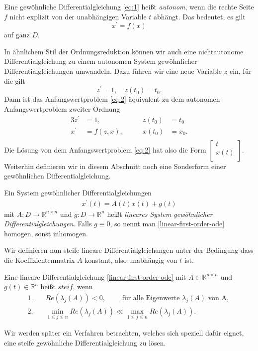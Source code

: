 \begin{definition}
    Eine gewöhnliche Differentialgleichung \eqref{eq:1} heißt {\em autonom}, wenn die rechte Seite $f$ nicht
    explizit von der unabhängigen Variable $t$ abhängt. Das bedeutet, es gilt
    \[
        x^{\prime} = f(x)
    \]
    auf ganz $D$.
\end{definition}
In ähnlichem Stil der Ordnungsreduktion können wir auch eine nichtautonome Differentialgleichung zu einem autonomen
System gewöhnlicher Differentialgleichungen umwandeln. Dazu führen wir eine neue Variable $z$ ein, für die gilt
\[
    z^{\prime} = 1, \quad z(t_0) = t_0.
\]
Dann ist das Anfangswertproblem \eqref{eq:2} äquivalent zu dem autonomen Anfangswertproblem zweiter Ordnung
\begin{alignat*}{3}
    z^{\prime} &= 1, \qquad &z(t_0) &= t_0 \\
    x^{\prime} &= f(z,x),\qquad  &x(t_0) &= x_0. \\
\end{alignat*}
Die Lösung von dem Anfangswertproblem \eqref{eq:2} hat also die Form $\left[ \begin{matrix}
                                         t\\
                                         x(t)\\
\end{matrix} \right].$
Weiterhin definieren wir in diesem Abschnitt noch eine Sonderform einer gewöhnlichen Differentialgleichung.
\begin{definition}
    Ein System gewöhnlicher Differentialgleichungen
    \begin{align}
        \label{linear-first-order-ode}
        x^{\prime}(t) = A(t)x(t) + g(t)
    \end{align}
    mit $A:D \rightarrow \mathbb{R}^{n \times n}$ und $g:D \rightarrow \mathbb{R}^n$ heißt
        {\em lineares System gewöhnlicher Differentialgleichungen}. Falls $g \equiv 0$, so nennt man
    \eqref{linear-first-order-ode} homogen, sonst inhomogen.
\end{definition}
Wir definieren nun steife lineare Differentialgleichungen unter der Bedingung dass die Koeffizientenmatrix $A$ konstant,
also unabhängig von $t$ ist.
\begin{definition}
    \label{steife-dgl}
    Eine lineare Differentialgleichung \eqref{linear-first-order-ode} mit $A \in \mathbb{R}^{n \times n}$ und
    $g(t) \in \mathbb{R}^n$ heißt $steif$, wenn
    \begin{align}
        1.& \quad Re(\lambda_j(A)) < 0, \qquad \text{ für alle Eigenwerte } \lambda_j(A) \text{ von A, }\\
        2.& \quad \min\limits_{1 \leq j \leq n} Re(\lambda_j(A)) \ll \max\limits_{1 \leq j \leq n} Re(\lambda_j(A)).
    \end{align}
\end{definition}
Wir werden später ein Verfahren betrachten, welches sich speziell dafür eignet, eine steife gewöhnliche
Differentialgleichung zu lösen.


